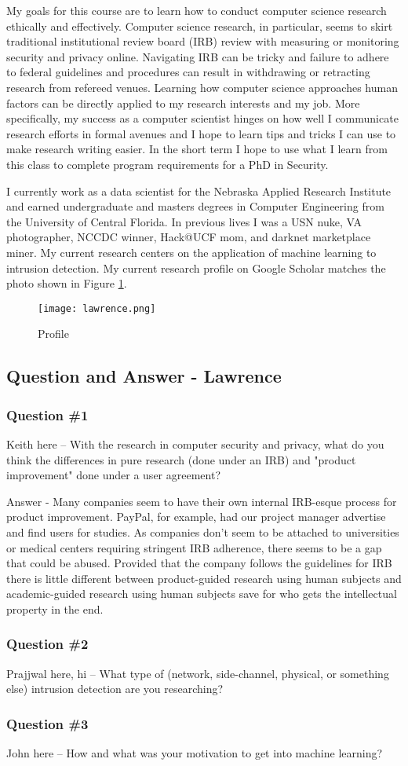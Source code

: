 My goals for this course are to learn how to conduct computer science research ethically and effectively. Computer science research, in particular, seems to skirt traditional institutional review board (IRB) review with measuring or monitoring security and privacy online. Navigating IRB can be tricky and failure to adhere to federal guidelines and procedures can result in withdrawing or retracting research from refereed venues. Learning how computer science approaches human factors can be directly applied to my research interests and my job. More specifically, my success as a computer scientist hinges on how well I communicate research efforts in formal avenues and I hope to learn tips and tricks I can use to make research writing easier. In the short term I hope to use what I learn from this class to complete program requirements for a PhD in Security.

I currently work as a data scientist for the Nebraska Applied Research Institute and earned undergraduate and masters degrees in Computer Engineering from the University of Central Florida. In previous lives I was a USN nuke, VA photographer, NCCDC winner, Hack@UCF mom, and darknet marketplace miner. My current research centers on the application of machine learning to intrusion detection. My current research profile on Google Scholar matches the photo shown in Figure \ref{fig:profile}.

\begin{figure}[h!]
   \centering
    \texttt{[image: lawrence.png]}
    \caption{Profile}
    \label{fig:profile}
\end{figure}

\subsection{Question and Answer - Lawrence}
\subsubsection{Question \#1}
Keith here -- With the research in computer security and privacy, what do you think the differences in pure research (done under an IRB) and "product improvement" done under a user agreement?

Answer - Many companies seem to have their own internal IRB-esque process for product improvement. PayPal, for example, had our project manager advertise and find users for studies. As companies don't seem to be attached to universities or medical centers requiring stringent IRB adherence, there seems to be a gap that could be abused. Provided that the company follows the guidelines for IRB there is little different between product-guided research using human subjects and academic-guided research using human subjects save for who gets the intellectual property in the end. 

\subsubsection{Question \#2}
Prajjwal here, hi -- What type of (network, side-channel, physical, or something else) intrusion detection are 
you researching?

\subsubsection{Question \#3}
John here -- How and what was your motivation to get into machine learning?
